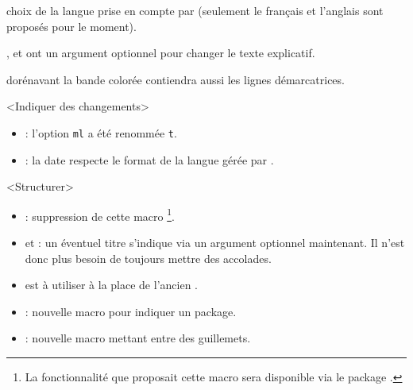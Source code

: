 \begin{bdoctopic}
    choix de la langue prise en compte par 
    (seulement le français et l'anglais sont proposés pour le moment).
\end{bdoctopic}




\begin{bdoctopic}
    ,
    et
    ont un argument optionnel pour changer le texte explicatif.
\end{bdoctopic}




\begin{bdoctopic}
    dorénavant la bande colorée contiendra aussi les lignes démarcatrices.
\end{bdoctopic}




\begin{bdoctopic}<Indiquer des changements>
    \begin{itemize}
        \item {} : 
              l'option \texttt{ml} a été renommée \texttt{t}.

        \item {} :
              la date respecte le format de la langue gérée par .
    \end{itemize}
\end{bdoctopic}




\begin{bdoctopic}<Structurer>
    \begin{itemize}
        \item {} :
              suppression de cette macro
              \footnote{
                  La fonctionnalité que proposait cette macro sera disponible via le package .
              }.

        \item {} et  :
              un éventuel titre s'indique via un argument optionnel maintenant.
              Il n'est donc plus besoin de toujours mettre des accolades.

        \item {}
              est à utiliser à la place de l'ancien
              .

        \item {} :
              nouvelle macro pour indiquer un package.

        \item {} :
              nouvelle macro mettant entre des guillemets.
    \end{itemize}
\end{bdoctopic}

